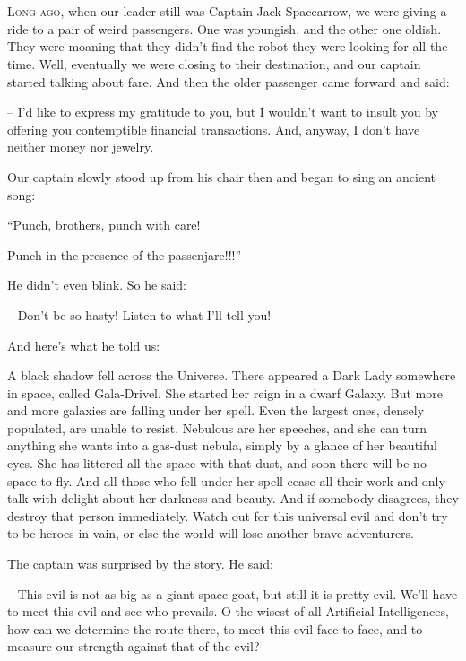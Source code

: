 \documentclass[ebook,oneside,final,openright]{memoir}
\begin{document}
\chapter{}
\par
\lettrine{L}{ong ago,} when our leader still was Captain Jack Spacearrow, we were giving a ride to a pair of weird passengers. One was youngish, and the other one oldish. They were moaning that they didn’t find the robot they were looking for all the time. Well, eventually we were closing to their destination, and our captain started talking about fare. And then the older passenger came forward and said: \par
\par
– I’d like to express my gratitude to you, but I wouldn’t want to insult you by offering you contemptible financial transactions. And, anyway, I don’t have neither money nor jewelry.\par
Our captain slowly stood up from his chair then and began to sing an ancient song: \par
“Punch, brothers, punch with care! \par
 Punch in the presence of the passenjare!!!” \par
He didn’t even blink. So he said:\par
– Don’t be so hasty! Listen to what I’ll tell you! \par
 And here’s what he told us:\par
\par
A black shadow fell across the Universe. There appeared a Dark Lady somewhere in space, called Gala-Drivel. She started her reign in a dwarf Galaxy. But more and more galaxies are falling under her spell. Even the largest ones, densely populated, are unable to resist. Nebulous are her speeches, and she can turn anything she wants into a gas-dust nebula, simply by a glance of her beautiful eyes. She has littered all the space with that dust, and soon there will be no space to fly. And all those who fell under her spell cease all their work and only talk with delight about her darkness and beauty. And if somebody disagrees, they destroy that person immediately. Watch out for this universal evil and don’t try to be heroes in vain, or else the world will lose another brave adventurers.\par
\par
The captain was surprised by the story. He said:\par
– This evil is not as big as a giant space goat, but still it is pretty evil. We’ll have to meet this evil and see who prevails. O the wisest of all Artificial Intelligences, how can we determine the route there, to meet this evil face to face, and to measure our strength against that of the evil?\par
\end{document}
